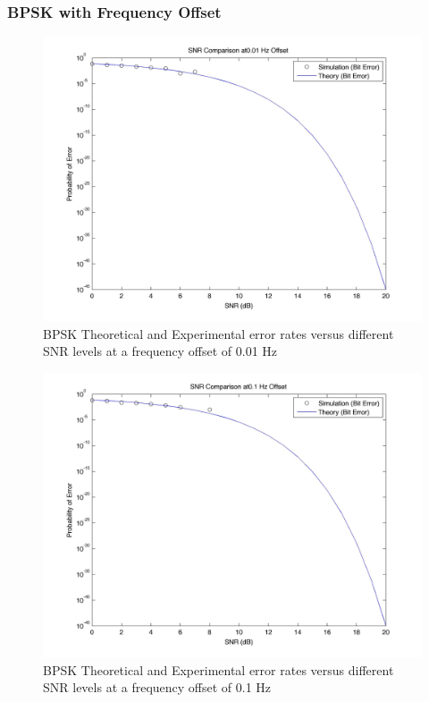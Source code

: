 \documentclass[]{article}
\begin{document}
\subsubsection{BPSK with Frequency Offset}
\begin{figure}[H]
\centering
\hspace*{-2cm}\includegraphics[width=1.3\textwidth]{bpSNRfo1.jpg}
\caption{BPSK Theoretical and Experimental error rates versus different SNR levels at a frequency offset of 0.01 Hz}
\end{figure}

\begin{figure}[H]
\centering
\hspace*{-2cm}\includegraphics[width=1.3\textwidth]{bpSNRfo2.jpg}
\caption{BPSK Theoretical and Experimental error rates versus different SNR levels at a frequency offset of 0.1 Hz}
\end{figure}
\end{document}
